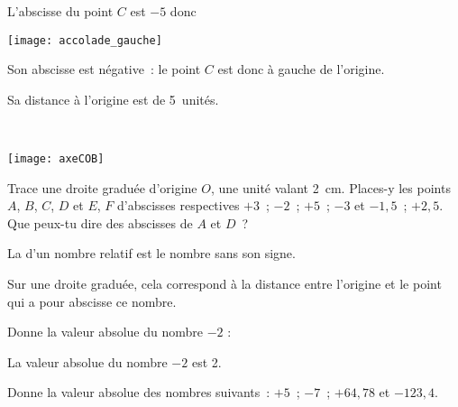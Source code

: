 \begin{methode*1}
\begin{exemple*1}
\begin{minipage}[c]{0.4\linewidth}
L'abscisse du point $C$ est $- 5$ donc
 \end{minipage} \hfill%
 \begin{minipage}[c]{0.1\linewidth}
 \begin{center}\texttt{[image: accolade\_gauche]}\end{center}
  \end{minipage} \hfill%
  \begin{minipage}[c]{0.4\linewidth}
  Son abscisse est négative : le point $C$ est donc à gauche de l'origine. 
  
  Sa distance à l'origine est de 5 unités.
   \end{minipage} \\
\begin{center} \texttt{[image: axeCOB]} \end{center}
\end{exemple*1}


\exercice
Trace une droite graduée d'origine $O$, une unité valant 2 cm. Places-y les points $A$, $B$, $C$, $D$ et  $E$, $F$ d'abscisses respectives $+ 3$ ; $- 2$ ; $+ 5$ ; $- 3$ et $- 1,5$ ; $+ 2,5$. Que peux-tu dire des abscisses de $A$ et $D$ ?

\end{methode*1}



\begin{methode*1}

\begin{aconnaitre}
La  d'un nombre relatif est le nombre sans son signe.

Sur une droite graduée, cela correspond à la distance entre l'origine et le point qui a pour abscisse ce nombre.
\end{aconnaitre}

\begin{exemple*1}
Donne la valeur absolue du nombre $- 2$ :

La valeur absolue du nombre $- 2$ est 2.
\end{exemple*1}


\exercice
Donne la valeur absolue des nombres suivants : $+ 5$ ; $- 7$ ; $+ 64,78$ et $- 123,4$.

\end{methode*1}


